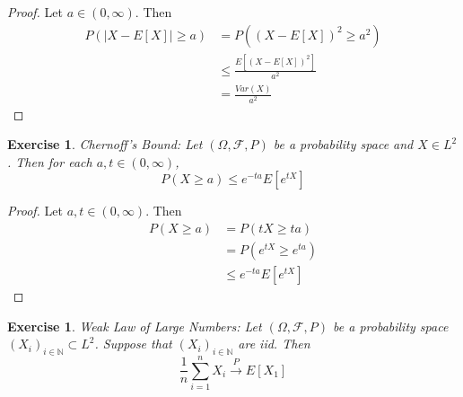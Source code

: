 \documentclass[12pt]{amsart}
\newtheorem{ex}[thm]{Exercise}
\newcommand{\Om}{\Omega}
\newcommand{\N}{\mathbb{N}}
\newcommand{\MF}{\mathcal{F}}
\newcommand{\conv}[1]{\xrightarrow{#1}}
\begin{document}
	\begin{proof}
		Let $a \in (0, \infty)$. Then 
		\begin{align*}
			P(\vert X - E[X] \vert \geq a) 
			&= P((X - E[X])^2 \geq a^2) \\
			&\leq \frac{E[(X - E[X])^2]}{a^2} \\
			&= \frac{Var(X)}{a^2}  
		\end{align*}
	\end{proof}
	
	\begin{ex}{Chernoff's Bound:}
		Let $(\Om, \MF, P)$ be a probability space and $X \in L^2$. Then for each $a, t \in (0, \infty)$, $$P( X \geq a) \leq e^{-ta}E[e^{tX}]$$
	\end{ex}
	
	\begin{proof}
		Let $a, t \in (0, \infty)$. Then 
		\begin{align*}
			P( X \geq a)
			&= P(tX \geq ta) \\
			&= P(e^{tX} \geq e^{ta}) \\
			& \leq e^{-ta}E[e^{tX}]
		\end{align*}
	\end{proof}
	
	\begin{ex}{Weak Law of Large Numbers:}
		Let $(\Om, \MF, P)$ be a probability space $(X_i)_{i\in \N} \subset L^2$. Suppose that $(X_i)_{i\in \N}$ are iid. Then $$\frac{1}{n}\sum_{i=1}^n X_i \conv{P} E[X_1]$$
	\end{ex}
	
\end{document}
